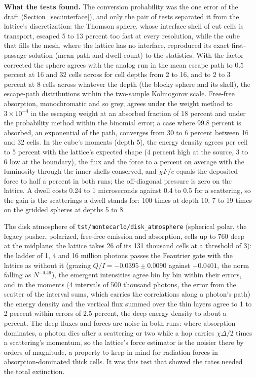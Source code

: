 \documentclass[11pt]{article}
\begin{document}
\textbf{What the tests found.}  The conversion probability was the one error of the
draft (Section~\ref{sec:interface}), and only the pair of tests separated it from the
lattice's discretization: the Thomson sphere, whose interface shell of cut cells is
transport, escaped 5 to 13 percent too fast at every resolution, while the cube that
fills the mesh, where the lattice has no interface, reproduced its exact first-passage
solution (mean path and dwell count) to the statistics.  With the factor corrected the
sphere agrees with the analog run in the mean escape path to 0.5 percent at 16 and 32
cells across for cell depths from 2 to 16, and to 2 to 3 percent at 8 cells across
whatever the depth (the blocky sphere and its shell), the escape-path distributions
within the two-sample Kolmogorov scale.  Free-free absorption, monochromatic and so
grey, agrees under the weight method to $3\times10^{-4}$ in the escaping weight at an
absorbed fraction of 18 percent and under the probability method within the binomial
error; a case where 99.8 percent is absorbed, an exponential of the path, converges
from 30 to 6 percent between 16 and 32 cells.  In the cube's moments (depth 5), the
energy density agrees per cell to 5 percent with the lattice's expected shape (4
percent high at the source, 3 to 6 low at the boundary), the flux and the force to a
percent on average with the luminosity through the inner shells conserved, and
$\chi F/c$ equals the deposited force to half a percent in both runs; the off-diagonal
pressure is zero on the lattice.  A dwell costs 0.24 to 1 microseconds against 0.4 to
0.5 for a scattering, so the gain is the scatterings a dwell stands for: 100 times at
depth 10, 7 to 19 times on the gridded spheres at depths 5 to 8.

The disk atmosphere of \texttt{tst/montecarlo/disk\_atmosphere} (spherical polar, the
legacy pusher, polarized, free-free emission and absorption, cells up to 760 deep at
the midplane; the lattice takes 26 of its 131 thousand cells at a threshold of 3):
the ladder of 1, 4 and 16 million photons passes the Feautrier gate with the lattice
as without it (grazing $Q/I = -0.0395 \pm 0.0090$ against $-0.0401$, the norm falling as
$N^{-0.49}$), the emergent intensities agree bin by bin within their errors, and in
the moments (4 intervals of 500 thousand photons, the error from the scatter of the
interval sums, which carries the correlations along a photon's path) the energy
density and the vertical flux summed over the thin layers agree to 1 to 2 percent
within errors of 2.5 percent, the deep energy density to about a percent.  The deep
fluxes and forces are noise in both runs: where absorption dominates, a photon dies
after a scattering or two while a hop carries $\chi\Delta/2$ times a scattering's
momentum, so the lattice's force estimator is the noisier there by orders of
magnitude, a property to keep in mind for radiation forces in absorption-dominated
thick cells.  It was this test that showed the rates needed the total extinction.
\end{document}
